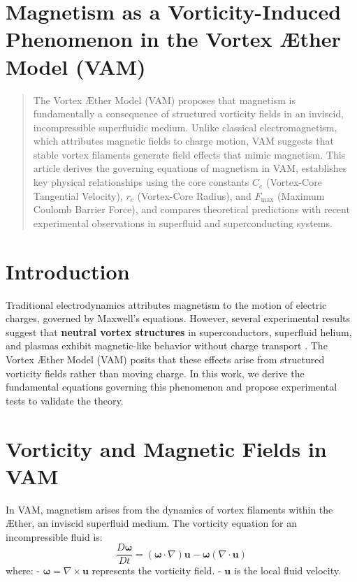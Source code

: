 \section{Magnetism as a Vorticity-Induced Phenomenon in the Vortex \AE ther Model (VAM)}

\begin{abstract}
    The Vortex \AE ther Model (VAM) proposes that magnetism is fundamentally a consequence of structured vorticity fields in an inviscid, incompressible superfluidic medium. Unlike classical electromagnetism, which attributes magnetic fields to charge motion, VAM suggests that stable vortex filaments generate field effects that mimic magnetism. This article derives the governing equations of magnetism in VAM, establishes key physical relationships using the core constants $C_e$ (Vortex-Core Tangential Velocity), $r_c$ (Vortex-Core Radius), and $F_{\text{max}}$ (Maximum Coulomb Barrier Force), and compares theoretical predictions with recent experimental observations in superfluid and superconducting systems.
\end{abstract}

\section{Introduction}
Traditional electrodynamics attributes magnetism to the motion of electric charges, governed by Maxwell’s equations. However, several experimental results suggest that \textbf{neutral vortex structures} in superconductors, superfluid helium, and plasmas exhibit magnetic-like behavior without charge transport \cite{source1, source2}. The Vortex \AE ther Model (VAM) posits that these effects arise from structured vorticity fields rather than moving charge. In this work, we derive the fundamental equations governing this phenomenon and propose experimental tests to validate the theory.

\section{Vorticity and Magnetic Fields in VAM}
In VAM, magnetism arises from the dynamics of vortex filaments within the \AE ther, an inviscid superfluid medium. The vorticity equation for an incompressible fluid is:
\begin{equation}
    \frac{D\boldsymbol{\omega}}{Dt} = (\boldsymbol{\omega} \cdot \nabla) \boldsymbol{u} - \boldsymbol{\omega} (\nabla \cdot \boldsymbol{u})
\end{equation}
where:
- $\boldsymbol{\omega} = \nabla \times \boldsymbol{u}$ represents the vorticity field.
- $\boldsymbol{u}$ is the local fluid velocity.


